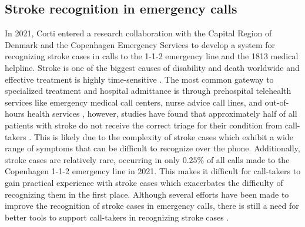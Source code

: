 \subsection{Stroke recognition in emergency calls}
%
In 2021, Corti entered a research collaboration with the Capital Region of Denmark and the Copenhagen Emergency Services to develop a system for recognizing stroke cases in calls to the 1-1-2 emergency line and the 1813 medical helpline. 
Stroke is one of the biggest causes of disability and death worldwide \cite{cite1,cite2,cite3} and effective treatment is highly time-sensitive \cite{cite4,cite5}. The most common gateway to specialized treatment and hospital admittance is through prehospital telehealth services like emergency medical call centers, nurse advice call lines, and out-of-hours health services \cite{cite6,cite7}, however, studies have found that approximately half of all patients with stroke do not receive the correct triage for their condition from call-takers \cite{cite10,cite11,cite12}. 
This is likely due to the complexity of stroke cases which exhibit a wide range of symptoms that can be difficult to recognize over the phone. Additionally, stroke cases are relatively rare, occurring in only $0.25\%$ of all calls made to the Copenhagen 1-1-2 emergency line in 2021. This makes it difficult for call-takers to gain practical experience with stroke cases which exacerbates the difficulty of recognizing them in the first place. Although several efforts have been made to improve the recognition of stroke cases in emergency calls, there is still a need for better tools to support call-takers in recognizing stroke cases \cite{cite13,cite14,cite15}.

